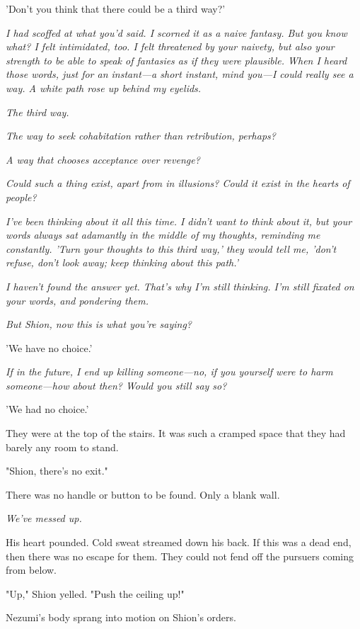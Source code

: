 'Don't you think that there could be a third way?'

\emph{I had scoffed at what you'd said. I scorned it as a naive fantasy. But
you know what? I felt intimidated, too. I felt threatened by your
naivety, but also your strength to be able to speak of fantasies as if
they were plausible. When I heard those words, just for an instant---a
short instant, mind you---I could really see a way. A white path rose up
behind my eyelids.}

\emph{The third way.}

\emph{The way to seek cohabitation rather than retribution, perhaps?}

\emph{A way that chooses acceptance over revenge?}

\emph{Could such a thing exist, apart from in illusions? Could it exist in the
hearts of people?}

\emph{I've been thinking about it all this time. I didn't want to think about
it, but your words always sat adamantly in the middle of my thoughts,
reminding me constantly. 'Turn your thoughts to this third way,' they
would tell me, 'don't refuse, don't look away; keep thinking about this
path.'}

\emph{I haven't found the answer yet. That's why I'm still thinking. I'm still
fixated on your words, and pondering them.}

\emph{But Shion, now this is what you're saying?}

'We have no choice.'

\emph{If in the future, I end up killing someone---no, if you yourself were to
harm someone---how about then? Would you still say so?}

'We had no choice.'

\mybreak

They were at the top of the stairs. It was such a cramped space that
they had barely any room to stand.

"Shion, there's no exit."

There was no handle or button to be found. Only a blank wall.

\emph{We've messed up.}

His heart pounded. Cold sweat streamed down his back. If this was a dead
end, then there was no escape for them. They could not fend off the
pursuers coming from below.

"Up," Shion yelled. "Push the ceiling up!"~

Nezumi's body sprang into motion on Shion's orders.

